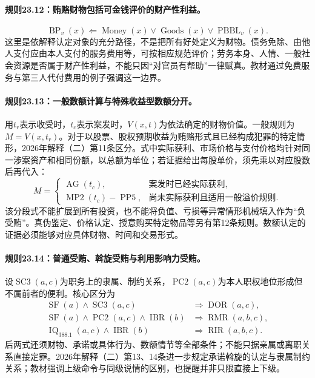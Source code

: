 \paragraph{规则23.12：贿赂财物包括可金钱评价的财产性利益。}
\[
\operatorname{BP}_v(x)
\Leftarrow\operatorname{Money}(x)\lor\operatorname{Goods}(x)
\lor\operatorname{PBBL}_v(x).
\]
这里是依解释认定对象的充分路径，不是把所有好处定义为财物。债务免除、由他人支付应由本人支付的服务费用等，可按相应规范评价；劳务本身、人情、一般社会资源是否属于财产性利益，不能只因“对官员有帮助”一律赋真。教材通过免费服务与第三人代付费用的例子强调这一边界。

\paragraph{规则23.13：一般数额计算与特殊收益型数额分开。}
用$t_r$表示收受时，$t_c$表示案发时，$V(x,t)$为依法确定的财物价值。一般规则为$M=V(x,t_r)$。对于以股票、股权预期收益为贿赂形式且已经构成犯罪的特定情形，2026年解释（二）第11条区分。式中实际获利、市场价格与支付价格均针对同一涉案资产和相同份额，以总额为单位；若证据给出每股单价，须先乘以对应股数后再代入：
\[
M=\begin{cases}
\operatorname{AG}(t_c),&\text{案发时已经实际获利},\\
\operatorname{MP2}(t_c)-\operatorname{PP5},
&\text{尚未实际获利且适用一般溢价规则}.
\end{cases}
\]
该分段式不能扩展到所有投资，也不能将负值、亏损等异常情形机械填入作为“负受贿”。真伪鉴定、价格认定、授意购买特定物品等另有第12条规则。数额认定的证据必须能够对应具体财物、时间和交易形式。

\paragraph{规则23.14：普通受贿、斡旋受贿与利用影响力受贿。}
设$\operatorname{SC3}(a,c)$为职务上的隶属、制约关系，$\operatorname{PC2}(a,c)$为本人职权地位形成但不属前者的便利。核心区分为
\[
\begin{aligned}
\operatorname{SF}(a)\land\operatorname{SC3}(a,c)
&\Rightarrow\operatorname{DOR}(a,c),\\
\operatorname{SF}(a)\land\operatorname{PC2}(a,c)
\land\operatorname{IBR}(b)
&\Rightarrow\operatorname{RMR}(a,b,c),\\
\operatorname{IQ}_{388.1}(a,c)
\land\operatorname{IBR}(b)
&\Rightarrow\operatorname{RIR}(a,b,c).
\end{aligned}
\]
后两式还须财物、承诺或具体行为、数额情节等全部条件；不能只据亲属或离职关系直接定罪。2026年解释（二）第13、14条进一步规定承诺斡旋的认定与隶属制约关系；教材强调上级命令与同级说情的区别，也提醒并非只限直接上下级。

